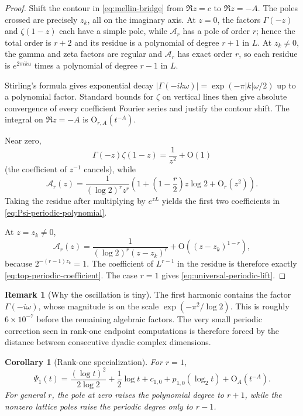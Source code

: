 \documentclass[11pt,a4paper]{article}
\theoremstyle{frontier}
\newtheorem{corollary}[theorem]{Corollary}
\theoremstyle{definition}
\newtheorem{remark}[theorem]{Remark}
\newcommand{\bigO}{\mathrm O}
\begin{document}
\begin{proof}
Shift the contour in \eqref{eq:mellin-bridge} from $\Re z=c$ to $\Re z=-A$.  The poles crossed are precisely $z_k$, all on the imaginary axis.  At $z=0$, the factors $\Gamma(-z)$ and $\zeta(1-z)$ each have a simple pole, while $\mathcal A_r$ has a pole of order $r$; hence the total order is $r+2$ and its residue is a polynomial of degree $r+1$ in $L$.  At $z_k\ne0$, the gamma and zeta factors are regular and $\mathcal A_r$ has exact order $r$, so each residue is $e^{2\pi iku}$ times a polynomial of degree $r-1$ in $L$.

Stirling's formula gives exponential decay
$|\Gamma(-ik\omega)|=\exp(-\pi|k|\omega/2)$ up to a polynomial factor.  Standard bounds for $\zeta$ on vertical lines then give absolute convergence of every coefficient Fourier series and justify the contour shift.  The integral on $\Re z=-A$ is $\bigO_{r,A}(t^{-A})$.

Near zero,
\[
 \Gamma(-z)\zeta(1-z)=\frac1{z^2}+\bigO(1)
\]
(the coefficient of $z^{-1}$ cancels), while
\[
 \mathcal A_r(z)=\frac1{(\log2)^rz^r}
 \left(1+\left(1-\frac r2\right)z\log2+\bigO_r(z^2)\right).
\]
Taking the residue after multiplying by $e^{zL}$ yields the first two coefficients in \eqref{eq:Psi-periodic-polynomial}.

At $z=z_k\ne0$,
\[
 \mathcal A_r(z)=\frac1{(\log2)^r(z-z_k)^r}
 +\bigO((z-z_k)^{1-r}),
\]
because $2^{-(r-1)z_k}=1$.  The coefficient of $L^{r-1}$ in the residue is therefore exactly \eqref{eq:top-periodic-coefficient}.  The case $r=1$ gives \eqref{eq:universal-periodic-lift}.
\end{proof}

\begin{remark}[Why the oscillation is tiny]
The first harmonic contains the factor
$\Gamma(-i\omega)$, whose magnitude is on the scale
$\exp(-\pi^2/\log2)$.  This is roughly $6\times10^{-7}$ before the remaining algebraic factors.  The very small periodic correction seen in rank-one endpoint computations is therefore forced by the distance between consecutive dyadic complex dimensions.
\end{remark}

\begin{corollary}[Rank-one specialization]\label{cor:rank-one-Psi}
For $r=1$,
\begin{equation}\label{eq:rank-one-Psi}
 \Psi_1(t)=\frac{(\log t)^2}{2\log2}
 +\frac12\log t+c_{1,0}+p_{1,0}(\log_2t)
 +\bigO_A(t^{-A}).
\end{equation}
For general $r$, the pole at zero raises the polynomial degree to $r+1$, while the nonzero lattice poles raise the periodic degree only to $r-1$.
\end{corollary}
\end{document}
